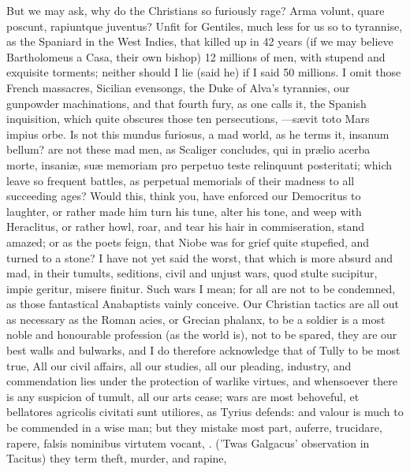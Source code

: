 {But we may ask, why do the Christians so furiously rage? Arma
volunt, quare poscunt, rapiuntque juventus? Unfit for Gentiles, much
less for us so to tyrannise, as the Spaniard in the West Indies, that
killed up in 42 years (if we may believe Bartholomeus a Casa,
their own bishop) 12 millions of men, with stupend and exquisite
torments; neither should I lie (said he) if I said 50 millions. I omit
those French massacres, Sicilian evensongs, the Duke of Alva's
tyrannies, our gunpowder machinations, and that fourth fury, as
one calls it, the Spanish inquisition, which quite obscures those
ten persecutions, ---s\ae{}vit toto Mars impius orbe. Is not this
mundus furiosus, a mad world, as he terms it, insanum bellum? are
not these mad men, as Scaliger concludes, qui in pr\ae{}lio acerba
morte, insani\ae{}, su\ae{} memoriam pro perpetuo teste relinquunt
posteritati; which leave so frequent battles, as perpetual memorials of
their madness to all succeeding ages? Would this, think you, have
enforced our Democritus to laughter, or rather made him turn his tune,
alter his tone, and weep with Heraclitus, or rather howl,
roar, and tear his hair in commiseration, stand amazed; or as the
poets feign, that Niobe was for grief quite stupefied, and turned to a
stone? I have not yet said the worst, that which is more absurd and
mad, in their tumults, seditions, civil and unjust wars, quod
stulte sucipitur, impie geritur, misere finitur. Such wars I mean; for
all are not to be condemned, as those fantastical Anabaptists vainly
conceive. Our Christian tactics are all out as necessary as the Roman
acies, or Grecian phalanx, to be a soldier is a most noble and
honourable profession (as the world is), not to be spared, they are our
best walls and bulwarks, and I do therefore acknowledge that of
Tully to be most true, All our civil affairs, all our studies, all
our pleading, industry, and commendation lies under the protection of
warlike virtues, and whensoever there is any suspicion of tumult, all
our arts cease; wars are most behoveful, et bellatores agricolis
civitati sunt utiliores, as Tyrius defends: and valour is much to
be commended in a wise man; but they mistake most part, auferre,
trucidare, rapere, falsis nominibus virtutem vocant, \etc{}. ('Twas
Galgacus' observation in Tacitus) they term theft, murder, and rapine,
}
